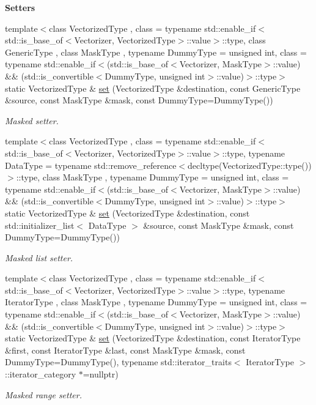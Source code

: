 \begin{Indent}{\bf Setters}
\begin{DoxyCompactItemize}
{\footnotesize template$<$class Vectorized\-Type , class  = typename std\-::enable\-\_\-if$<$std\-::is\-\_\-base\-\_\-of$<$\-Vectorizer, Vectorized\-Type$>$\-::value$>$\-::type, class Generic\-Type , class Mask\-Type , typename Dummy\-Type  = unsigned int, class  = typename std\-::enable\-\_\-if$<$(std\-::is\-\_\-base\-\_\-of$<$\-Vectorizer, Mask\-Type$>$\-::value) \&\& (std\-::is\-\_\-convertible$<$\-Dummy\-Type, unsigned int$>$\-::value)$>$\-::type$>$ }\\static Vectorized\-Type \& \hyperlink{classmagrathea_1_1Vectorizer_a5ea3e9a7f164f31f1f8f9b7ab3abe12c}{set} (Vectorized\-Type \&destination, const Generic\-Type \&source, const Mask\-Type \&mask, const Dummy\-Type=Dummy\-Type())
\begin{DoxyCompactList}\small\item\em Masked setter. \end{DoxyCompactList}\item 
{\footnotesize template$<$class Vectorized\-Type , class  = typename std\-::enable\-\_\-if$<$std\-::is\-\_\-base\-\_\-of$<$\-Vectorizer, Vectorized\-Type$>$\-::value$>$\-::type, typename Data\-Type  = typename std\-::remove\-\_\-reference$<$decltype(\-Vectorized\-Type\-::type())$>$\-::type, class Mask\-Type , typename Dummy\-Type  = unsigned int, class  = typename std\-::enable\-\_\-if$<$(std\-::is\-\_\-base\-\_\-of$<$\-Vectorizer, Mask\-Type$>$\-::value) \&\& (std\-::is\-\_\-convertible$<$\-Dummy\-Type, unsigned int$>$\-::value)$>$\-::type$>$ }\\static Vectorized\-Type \& \hyperlink{classmagrathea_1_1Vectorizer_aacc7d73a284fc36d87653df867ef6e00}{set} (Vectorized\-Type \&destination, const std\-::initializer\-\_\-list$<$ Data\-Type $>$ \&source, const Mask\-Type \&mask, const Dummy\-Type=Dummy\-Type())
\begin{DoxyCompactList}\small\item\em Masked list setter. \end{DoxyCompactList}\item 
{\footnotesize template$<$class Vectorized\-Type , class  = typename std\-::enable\-\_\-if$<$std\-::is\-\_\-base\-\_\-of$<$\-Vectorizer, Vectorized\-Type$>$\-::value$>$\-::type, typename Iterator\-Type , class Mask\-Type , typename Dummy\-Type  = unsigned int, class  = typename std\-::enable\-\_\-if$<$(std\-::is\-\_\-base\-\_\-of$<$\-Vectorizer, Mask\-Type$>$\-::value) \&\& (std\-::is\-\_\-convertible$<$\-Dummy\-Type, unsigned int$>$\-::value)$>$\-::type$>$ }\\static Vectorized\-Type \& \hyperlink{classmagrathea_1_1Vectorizer_a0f6c5228f8e7f3bba38d57886a4ef51a}{set} (Vectorized\-Type \&destination, const Iterator\-Type \&first, const Iterator\-Type \&last, const Mask\-Type \&mask, const Dummy\-Type=Dummy\-Type(), typename std\-::iterator\-\_\-traits$<$ Iterator\-Type $>$\-::iterator\-\_\-category $\ast$=nullptr)
\begin{DoxyCompactList}\small\item\em Masked range setter. \end{DoxyCompactList}\end{DoxyCompactItemize}
\end{Indent}
